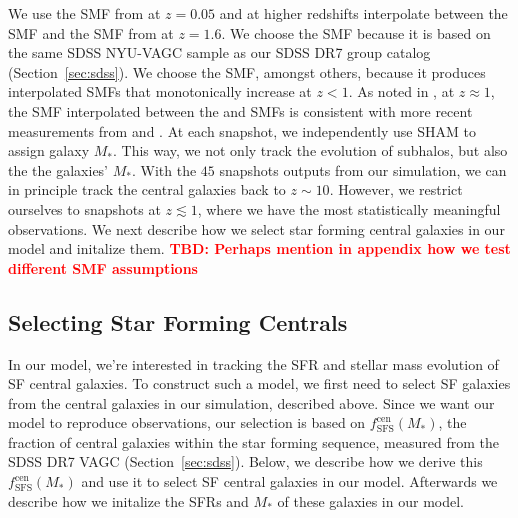 \documentclass[12pt, letterpaper, preprint]{aastex}
\newcommand{\todo}[1]{{\bf \textcolor{red}{#1}}}
\begin{document}
We use the SMF from \cite{li2009} at $z = 0.05$ and at higher redshifts 
interpolate between the \cite{li2009} SMF and the SMF from \cite{marchesini2009} 
at $z = 1.6$. We choose the \cite{li2009} SMF because it is based on the 
same SDSS NYU-VAGC sample as our SDSS DR7 group catalog (Section~\ref{sec:sdss}). 
We choose the \cite{marchesini2009} SMF, amongst others, because it produces 
interpolated SMFs that monotonically increase at $z < 1$. As noted in 
\cite{hahn2017a}, at $z \approx 1$, the SMF interpolated between the 
\cite{li2009} and \cite{marchesini2009} SMFs is consistent with more 
recent measurements from \cite{muzzin2013} and \cite{ilbert2013}. 
At each snapshot, we independently use SHAM to assign galaxy $M_*$. 
This way, we not only track the evolution of subhalos, but also the 
the galaxies' $M_*$. With the $45$ snapshots outputs from our simulation, 
we can in principle track the central galaxies back to $z \sim 10$. 
However, we restrict ourselves to snapshots at $z \lesssim 1$, where we 
have the most statistically meaningful observations. We next describe
how we select star forming central galaxies in our model and initalize them. 
\todo{TBD: Perhaps mention in appendix how we test different SMF assumptions}%


\subsection{Selecting Star Forming Centrals}  \label{sec:sfcen}
In our model, we're interested in tracking the SFR and stellar mass 
evolution of SF central galaxies. To construct such a model, we 
first need to select SF galaxies from the central galaxies in our 
simulation, described above. Since we want our model to reproduce 
observations, our selection is based on $f^\mathrm{cen}_\mathrm{SFS}(M_*)$, 
the fraction of central galaxies within the star forming sequence, 
measured from the SDSS DR7 VAGC (Section~\ref{sec:sdss}). Below, we 
describe how we derive this $f^\mathrm{cen}_\mathrm{SFS}(M_*)$ and use 
it to select SF central galaxies in our model. Afterwards we describe how 
we initalize the SFRs and $M_*$ of these galaxies in our model.
\end{document}
